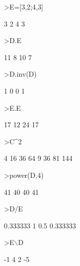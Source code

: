 \documentclass[a4paper,10pt]{article}
\begin{document}
\begin{eulernotebook}
\begin{eulercomment}
\begin{eulercomment}
\begin{euleroutput}
\end{euleroutput}
\begin{eulerprompt}
>E=[3,2;4,3]
\end{eulerprompt}
\begin{euleroutput}
              3             2 
              4             3 
\end{euleroutput}
\begin{eulerprompt}
>D.E
\end{eulerprompt}
\begin{euleroutput}
             11             8 
             10             7 
\end{euleroutput}
\begin{eulerprompt}
>D.inv(D)
\end{eulerprompt}
\begin{euleroutput}
              1             0 
              0             1 
\end{euleroutput}
\begin{eulerprompt}
>E.E
\end{eulerprompt}
\begin{euleroutput}
             17            12 
             24            17 
\end{euleroutput}
\begin{eulerprompt}
>C^2
\end{eulerprompt}
\begin{euleroutput}
              4            16            36            64 
              9            36            81           144 
\end{euleroutput}
\begin{eulerprompt}
>power(D,4)
\end{eulerprompt}
\begin{euleroutput}
             41            40 
             40            41 
\end{euleroutput}
\begin{eulerprompt}
>D/E
\end{eulerprompt}
\begin{euleroutput}
       0.333333             1 
            0.5      0.333333 
\end{euleroutput}
\begin{eulerprompt}
>E\(\backslash\)D
\end{eulerprompt}
\begin{euleroutput}
             -1             4 
              2            -5 
\end{euleroutput}
\begin{eulerprompt}

\end{eulerprompt}
\end{eulercomment}
\end{eulercomment}
\end{eulernotebook}
\end{document}
